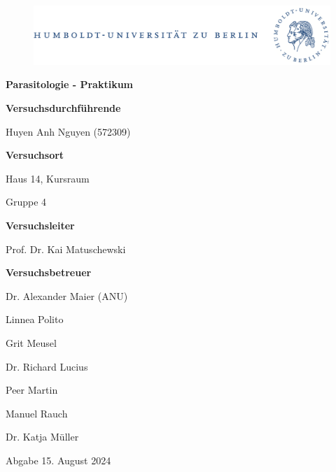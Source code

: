 \documentclass[oneside,10pt,a4paper]{report}
\begin{document}
	
	\begin{titlepage}
		\begin{center}
			\begin{figure}[h!tbp]
				\includegraphics[width=\linewidth]{HUlogo.PNG}
			\end{figure}
			\vspace*{2 cm}
			
			\textcolor{Bluetitle}{\textbf{\huge Parasitologie - Praktikum}}\par
			
			\vspace*{2cm}
			\textcolor{Greyish}{\textbf{Versuchsdurchführende}}\par
			\textcolor{Greyish}{Huyen Anh Nguyen (572309)}\par

			\vspace*{0.5cm}
			\textcolor{Greyish}{\textbf{Versuchsort}}\par
			\textcolor{Greyish}{Haus 14, Kursraum}\par
			\textcolor{Greyish}{Gruppe 4}\par

			
			\vspace*{2 cm}
			\textcolor{Greyish}{\textbf{Versuchsleiter}}\par
			\textcolor{Greyish}{Prof. Dr. Kai Matuschewski}\par
			\vspace*{0.5cm}
			\textcolor{Greyish}{\textbf{Versuchsbetreuer}}\par
			\textcolor{Greyish}{Dr. Alexander Maier (ANU)}\par
			\textcolor{Greyish}{Linnea Polito}\par
			\textcolor{Greyish}{Grit Meusel}\par
			\textcolor{Greyish}{Dr. Richard Lucius}\par
			\textcolor{Greyish}{Peer Martin}\par
			\textcolor{Greyish}{Manuel Rauch}\par
			\textcolor{Greyish}{Dr. Katja Müller}\par

			\vspace*{2 cm}
			\textcolor{Greyish}{Abgabe 15. August 2024}\par
			
			
			
		\end{center}
	\end{titlepage}
\end{document}

